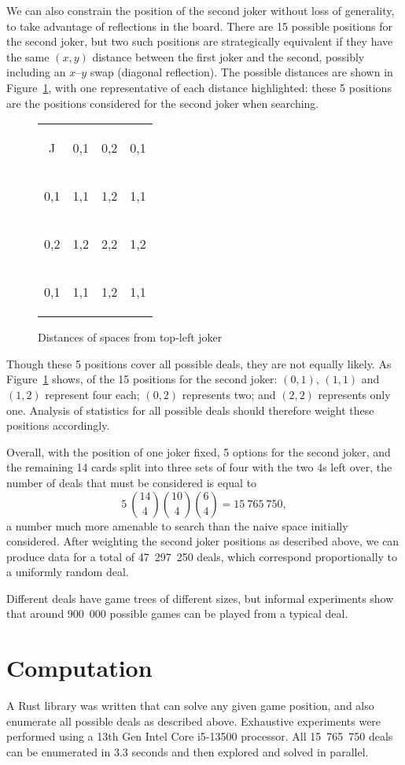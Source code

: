 \documentclass[a4paper, twocolumn]{article}
\newcommand\card[1]{\begin{tcolorbox}#1\end{tcolorbox}}
\newcommand\emphcard[1]{\begin{tcolorbox}[colback=red!30]#1\end{tcolorbox}}
\newcommand\customboard[8]{
  \setlength{\tabcolsep}{0.1cm}
  \begin{tabular}{c c c c}
    #1 & #2 & #3 & #4 \\
    #5 & #6 & #7 & #8 \\
    \customboardmore
}
\newcommand\customboardmore[8]{
    #1 & #2 & #3 & #4 \\
    #5 & #6 & #7 & #8
  \end{tabular}
}
\begin{document}
We can also constrain the position of the second joker without loss of
generality, to take advantage of reflections in the board. There are 15 possible positions for the second joker, but two
such positions are strategically equivalent if they have the same $(x, y)$
distance between the first joker and the second,
possibly including an $x$--$y$ swap (diagonal reflection). The possible distances are shown in
Figure~\ref{fig:joker-distances}, with one representative of each distance
highlighted: these 5 positions are the positions considered for the second joker
when searching.

\begin{figure}[ht]
  \centering
  \customboard
  {\card{J}} {\emphcard{0,1}} {\emphcard{0,2}} {\card{0,1}}
  {\card{0,1}} {\emphcard{1,1}} {\emphcard{1,2}} {\card{1,1}}
  {\card{0,2}} {\card{1,2}} {\emphcard{2,2}} {\card{1,2}}
  {\card{0,1}} {\card{1,1}} {\card{1,2}} {\card{1,1}}
  \caption{Distances of spaces from top-left joker}
  \label{fig:joker-distances}
\end{figure}

Though these 5 positions cover all possible deals, they are not equally
likely. As Figure~\ref{fig:joker-distances} shows, of the 15 positions for the
second joker: $(0,1)$, $(1,1)$ and $(1,2)$ represent four each; $(0,2)$
represents two; and $(2,2)$ represents only one. Analysis of statistics for all
possible deals should therefore weight these positions accordingly.

Overall, with the position of one joker fixed, 5 options for the second joker,
and the remaining 14 cards split into three sets of four with the two 4s left
over, the number of deals that must be considered is equal to
$$5~\binom{14}{4} \binom{10}{4} \binom{6}{4} = 15~765~750,$$
a number much more amenable to search than the naive space initially considered.
After weighting the second joker positions as described above, we can produce
data for a total of 47~297~250 deals, which correspond proportionally to a
uniformly random deal.

Different deals have game trees of different sizes, but informal experiments
show that around 900~000 possible games can be played from a typical deal.


\section{Computation}

A Rust library \cite{github} was written that can solve any given game position,
and also enumerate all possible deals as described above. Exhaustive experiments
were performed using a 13th Gen Intel Core i5-13500 processor. All 15~765~750
deals can be enumerated in 3.3 seconds and then explored and solved in
parallel.
\end{document}
